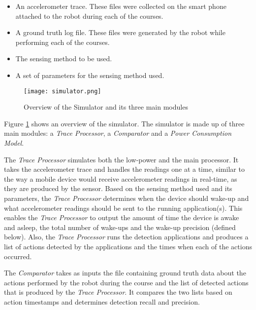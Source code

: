 \begin{itemize}
\setlength{\itemsep}{-3pt}  

\item An accelerometer trace. These files were collected on the smart phone attached to the robot during each of the courses.

\item A ground truth log file. These files were generated by the robot while performing each of the courses.

\item The sensing method to be used.

\item A set of parameters for the sensing method used.

\end{itemize}

\begin{figure}[t]
	\texttt{[image: simulator.png]}
	\caption{Overview of the Simulator and its three main modules}
	\label{fig:simulator}
\end{figure}

Figure \ref{fig:simulator} shows an overview of the simulator. The simulator is made up of three main modules: a \textit{Trace Processor}, a \textit{Comparator} and a \textit{Power Consumption Model}. 

The \textit{Trace Processor} simulates both the low-power and the main processor. It takes the accelerometer trace and handles the readings one at a time, similar to the way a mobile device would receive accelerometer readings in real-time, as they are produced by the sensor. Based on the sensing method used and its parameters, the \textit{Trace Processor} determines when the device should wake-up and what accelerometer readings should be sent to the running application(s). This enables the \textit{Trace Processor} to output the amount of time the device is awake and asleep, the total number of wake-ups and the wake-up precision (defined below). Also, the \textit{Trace Processor} runs the detection applications and produces a list of actions detected by the applications and the times when each of the actions occurred.

The \textit{Comparator} takes as inputs the file containing ground truth data about the actions performed by the robot during the course and the list of detected actions that is produced by the \textit{Trace Processor}. It compares the two lists based on action timestamps and determines detection recall and precision.

